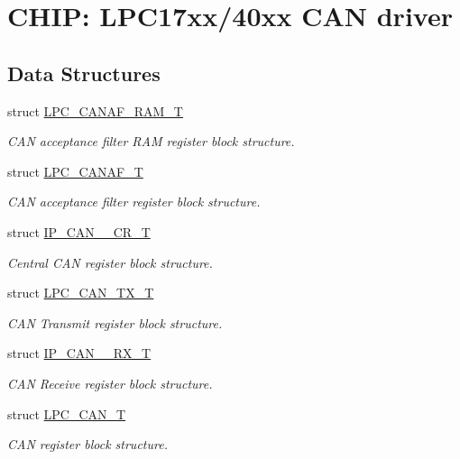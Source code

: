 \hypertarget{group__CAN__17XX__40XX}{\section{C\-H\-I\-P\-: L\-P\-C17xx/40xx C\-A\-N driver}
\label{group__CAN__17XX__40XX}
}
\subsection*{Data Structures}
\begin{DoxyCompactItemize}
\item 
struct \hyperlink{structLPC__CANAF__RAM__T}{L\-P\-C\-\_\-\-C\-A\-N\-A\-F\-\_\-\-R\-A\-M\-\_\-\-T}
\begin{DoxyCompactList}\small\item\em C\-A\-N acceptance filter R\-A\-M register block structure. \end{DoxyCompactList}\item 
struct \hyperlink{structLPC__CANAF__T}{L\-P\-C\-\_\-\-C\-A\-N\-A\-F\-\_\-\-T}
\begin{DoxyCompactList}\small\item\em C\-A\-N acceptance filter register block structure. \end{DoxyCompactList}\item 
struct \hyperlink{structIP__CAN__001__CR__T}{I\-P\-\_\-\-C\-A\-N\-\_\-\_\-\-C\-R\-\_\-\-T}
\begin{DoxyCompactList}\small\item\em Central C\-A\-N register block structure. \end{DoxyCompactList}\item 
struct \hyperlink{structLPC__CAN__TX__T}{L\-P\-C\-\_\-\-C\-A\-N\-\_\-\-T\-X\-\_\-\-T}
\begin{DoxyCompactList}\small\item\em C\-A\-N Transmit register block structure. \end{DoxyCompactList}\item 
struct \hyperlink{structIP__CAN__001__RX__T}{I\-P\-\_\-\-C\-A\-N\-\_\-\_\-\-R\-X\-\_\-\-T}
\begin{DoxyCompactList}\small\item\em C\-A\-N Receive register block structure. \end{DoxyCompactList}\item 
struct \hyperlink{structLPC__CAN__T}{L\-P\-C\-\_\-\-C\-A\-N\-\_\-\-T}
\begin{DoxyCompactList}\small\item\em C\-A\-N register block structure. \end{DoxyCompactList}\item 

\end{DoxyCompactItemize}
